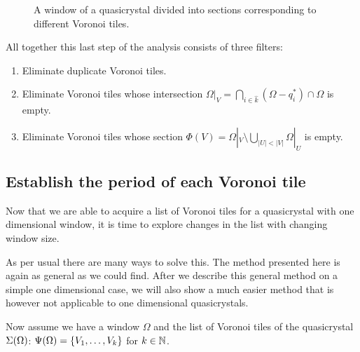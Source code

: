 \documentclass[text.tex]{subfiles}
\begin{document}
\begin{figure}[h!]

\caption{A window of a quasicrystal divided into sections corresponding to different Voronoi tiles. }
\label{fig_windowSectionsExampleWindowFinal}
\end{figure}

All together this last step of the analysis consists of three filters: 
\begin{enumerate}
\item Eliminate duplicate Voronoi tiles. 
\item Eliminate Voronoi tiles whose intersection $\Omega|_{V} = \bigcap\limits_{i\in\hat{k}}(\Omega-q_i^\ast)\cap\Omega$ is empty. 
\item Eliminate Voronoi tiles whose section $\Phi(V) = \Omega|_{V}\setminus\bigcup_{|U|<|V|}\Omega|_{U}$ is empty. 
\end{enumerate}

\subsection{Establish the period of each Voronoi tile}\label{sec_1DperiodOfVoronoiTile}
Now that we are able to acquire a list of Voronoi tiles for a quasicrystal with one dimensional window, it is time to explore changes in the list with changing window size. 

As per usual there are many ways to solve this. The method presented here is again as general as we could find. After we describe this general method on a simple one dimensional case, we will also show a much easier method that is however not applicable to one dimensional quasicrystals. 

Now assume we have a window $\Omega$ and the list of Voronoi tiles of the quasicrystal $\Sigma(\Omega)$: $\Psi(\Omega) = \{V_1,\dots,V_k\}$ for $k\in\mathbb{N}$. 
\end{document}
